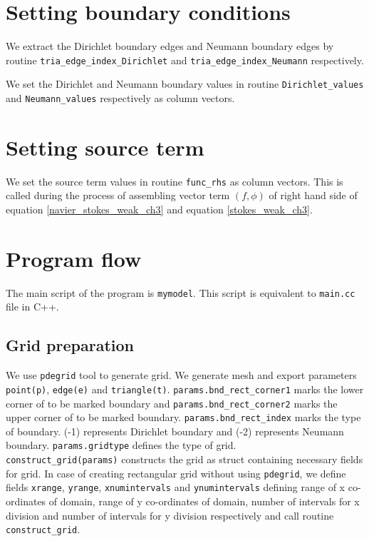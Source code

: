 \documentclass[a4paper]{book}
\begin{document}
\section{Setting boundary conditions}

We extract the Dirichlet boundary edges and Neumann boundary edges by routine \verb|tria_edge_index_Dirichlet| and \verb|tria_edge_index_Neumann| respectively.

We set the Dirichlet and Neumann boundary values in routine \verb|Dirichlet_values| and \verb|Neumann_values| respectively as column vectors. 

\section{Setting source term}

We set the source term values in routine \verb|func_rhs| as column vectors. This is called during the process of assembling vector term $(f,\phi)$ of right hand side of equation \ref{navier_stokes_weak_ch3} and equation \ref{stokes_weak_ch3}.

\section{Program flow}

The main script of the program is \verb|mymodel|. This script is equivalent to \verb|main.cc| file in C++.

\subsection{Grid preparation}

We use \verb|pdegrid| tool to generate grid. We generate mesh and export parameters \verb|point(p)|, \verb|edge(e)| and \verb|triangle(t)|. \verb|params.bnd_rect_corner1| marks the lower corner of to be marked boundary and \verb|params.bnd_rect_corner2| marks the upper corner of to be marked boundary. \verb|params.bnd_rect_index| marks the type of boundary. (-1) represents Dirichlet boundary and (-2) represents Neumann boundary. \verb|params.gridtype| defines the type of grid. \\

\verb|construct_grid(params)| constructs the grid as struct containing necessary fields for grid. In case of creating rectangular grid without using \verb|pdegrid|, we define fields \verb|xrange|, \verb|yrange|, \verb|xnumintervals| and \verb|ynumintervals| defining range of x co-ordinates of domain, range of y co-ordinates of domain, number of intervals for x division and number of intervals for y division respectively and call routine \verb|construct_grid|.
\end{document}
